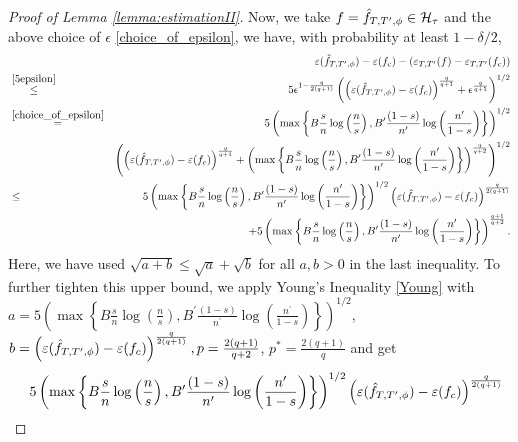 \documentclass[10pt,a4paper]{amsart}
\begin{document}
\begin{proof}[Proof of Lemma \ref{lemma:estimationII}]
Now, we take $f = \Hat{f}_{T, T^\prime,\phi} \in \mathcal{H}_\tau$ and the above choice of $\epsilon$ \eqref{choice_of_epsilon}, we have,  with probability at least $1-\delta/2$, 
\begin{eqnarray*}
&&  \varepsilon (\Hat{f}_{T, T^\prime,\phi}) - \varepsilon (f_c) - \left(\varepsilon_{T, T'} (f) - \varepsilon_{T, T'} (f_c)\right)\\
  &\stackrel{\eqref{5epsilon}}{\leq}& 5 \epsilon^{1-{\frac{q}{2(q+1)}}}\left(\left(\varepsilon (\Hat{f}_{T, T^\prime,\phi}) - \varepsilon (f_c)\right)^{\frac{q}{q+1}} + \epsilon^{\frac{q}{q+1}}\right)^{1/2}\\
  &\stackrel{\eqref{choice_of_epsilon}}{=}& 5 \left(  \max\left\{ B \frac{s}{n}
\log \left(\frac{n}{s}\right),B^\prime \frac{(1-s)}{n^\prime}\log \left(\frac{n^\prime}{1-s}\right) \right\}\right)^{1/2}\\
&&\left(\left(\varepsilon (\Hat{f}_{T, T^\prime,\phi}) - \varepsilon (f_c)\right)^{\frac{q}{q+1}} + \left( \max\left\{ B  \frac{s}{n}
\log \left(\frac{n}{s}\right), B^\prime \frac{(1-s)}{n^\prime}\log \left(\frac{n^\prime}{1-s}\right) \right\}\right)^{\frac{q}{q+2} } \right)^{1/2} \\
&\leq& 5 \left(  \max\left\{ B \frac{s}{n}
\log \left(\frac{n}{s}\right), B^\prime \frac{(1-s)}{n^\prime}\log \left(\frac{n^\prime}{1-s}\right) \right\} \right)^{1/2} \left(\varepsilon (\Hat{f}_{T, T^\prime,\phi}) - \varepsilon (f_c)\right)^{\frac{q}{2(q+1)}} \\
&& + 5 \left(  \max\left\{ B \frac{s}{n}
\log \left(\frac{n}{s}\right), B^\prime\frac{(1-s)}{n^\prime}\log \left(\frac{n^\prime}{1-s}\right) \right\}\right)^{\frac{q+1}{q+2}}.
\end{eqnarray*}
Here, we have used $\sqrt{a+b} \leq \sqrt{a} + \sqrt{b}$ for all $a,b >0$ in the last inequality.  To further tighten this upper bound, we apply Young's Inequality \eqref{Young} with\\
$a=5 \left(  \max\left\{  B\frac{s}{n}
\log \left(\frac{n}{s}\right),  B^\prime \frac{(1-s)}{n^\prime}\log \left(\frac{n^\prime}{1-s}\right) \right\} \right)^{1/2}$,
$b= \left(\varepsilon (\Hat{f}_{T, T^\prime,\phi}) - \varepsilon (f_c)\right)^{\frac{q}{2(q+1)}}, p=\frac{2(q+1)}{q+2}$, $ p^*=\frac{2(q+1)}{q}$ and get
\begin{eqnarray}\label{apply_Young}
  &&  5 \left(  \max\left\{  B\frac{s}{n}
\log \left(\frac{n}{s}\right),  B^\prime \frac{(1-s)}{n^\prime}\log \left(\frac{n^\prime}{1-s}\right) \right\} \right)^{1/2} \left(\varepsilon (\Hat{f}_{T, T^\prime,\phi}) - \varepsilon (f_c)\right)^{\frac{q}{2(q+1)}} \nonumber\\

\end{eqnarray}
\end{proof}
\end{document}
